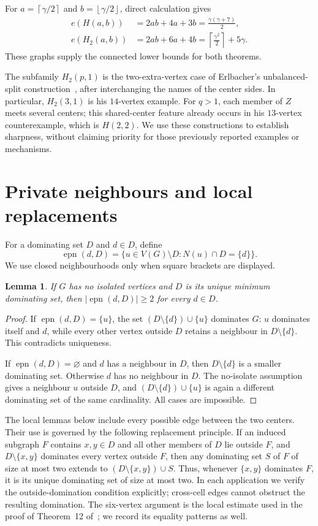 \documentclass[11pt]{article}
\newtheorem{lemma}[theorem]{Lemma}
\theoremstyle{definition}
\theoremstyle{remark}
\newcommand{\epn}{\operatorname{epn}}
\newcommand{\e}{e}
\newcommand{\ceil}[1]{\left\lceil#1\right\rceil}
\newcommand{\floor}[1]{\left\lfloor#1\right\rfloor}
\begin{document}
For $a=\ceil{\gamma/2}$ and $b=\floor{\gamma/2}$, direct calculation gives
\begin{align}
 \e(H(a,b))&=2ab+4a+3b=\frac{\gamma(\gamma+7)}2,\label{eq:attain}\\
 \e(H_2(a,b))&=2ab+6a+4b
     =\ceil{\frac{\gamma^2}{2}}+5\gamma.\label{eq:attain2}
\end{align}
These graphs supply the connected lower bounds for both theorems.

The subfamily $H_2(p,1)$ is the two-extra-vertex case of Erlbacher's
unbalanced-split construction~\cite{E}, after interchanging the names of
the center sides. In particular, $H_2(3,1)$ is his $14$-vertex example.
For $q>1$, each member of $Z$ meets several centers; this shared-center
feature already occurs in his $13$-vertex counterexample, which is $H(2,2)$.
We use these constructions to establish sharpness, without claiming
priority for those previously reported examples or mechanisms.

\section{Private neighbours and local replacements}

For a dominating set $D$ and $d\in D$, define
\[
 \epn(d,D)=\{u\in V(G)\setminus D:N(u)\cap D=\{d\}\}.
\]
We use closed neighbourhoods only when square brackets are displayed.

\begin{lemma}\label{lem:private}
If $G$ has no isolated vertices and $D$ is its unique minimum dominating set,
then $|\epn(d,D)|\ge2$ for every $d\in D$.
\end{lemma}

\begin{proof}
If $\epn(d,D)=\{u\}$, the set $(D\setminus\{d\})\cup\{u\}$ dominates $G$:
$u$ dominates itself and $d$, while every other vertex outside $D$ retains a
neighbour in $D\setminus\{d\}$. This contradicts uniqueness.

If $\epn(d,D)=\varnothing$ and $d$ has a neighbour in $D$, then
$D\setminus\{d\}$ is a smaller dominating set. Otherwise $d$ has no neighbour
in $D$. The no-isolate assumption gives a neighbour $u$ outside $D$, and
$(D\setminus\{d\})\cup\{u\}$ is again a different dominating set of the same
cardinality. All cases are impossible.
\end{proof}

The local lemmas below include every possible edge between the two centers.
Their use is governed by the following replacement principle. If an induced
subgraph $F$ contains $x,y\in D$ and all other members of $D$ lie outside $F$,
and $D\setminus\{x,y\}$ dominates every vertex outside $F$, then any
dominating set $S$ of $F$ of size at most two extends to
$(D\setminus\{x,y\})\cup S$. Thus, whenever $\{x,y\}$ dominates $F$, it
is its unique dominating set of size at most two. In each application we
verify the outside-domination condition explicitly; cross-cell edges cannot
obstruct the resulting domination.
The six-vertex argument is the local estimate used in the proof of
Theorem~12 of~\cite{KN}; we record its equality patterns as well.
\end{document}
